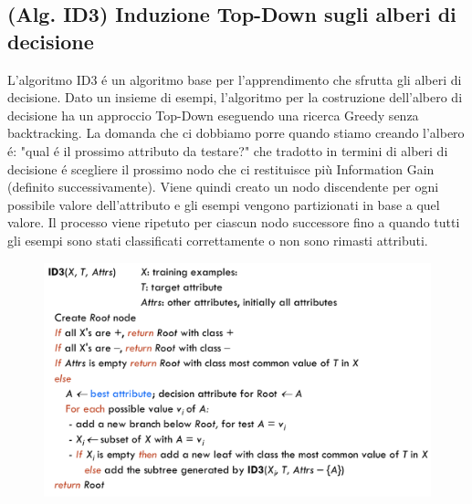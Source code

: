 \documentclass{article}
\begin{document}
\subsection{(Alg. ID3) Induzione Top-Down sugli alberi di decisione}
L'algoritmo ID3 é un algoritmo base per l'apprendimento che sfrutta gli alberi di decisione. Dato un insieme di esempi, l'algoritmo per la costruzione dell'albero di decisione ha un approccio Top-Down eseguendo una ricerca Greedy senza backtracking. La domanda che ci dobbiamo porre quando stiamo creando l'albero é: "qual é il prossimo attributo da testare?" che tradotto in termini di alberi di decisione é scegliere il prossimo nodo che ci restituisce più Information Gain (definito successivamente). Viene quindi creato un nodo discendente per ogni possibile valore dell'attributo e gli esempi vengono partizionati in base a quel valore. Il processo viene ripetuto per ciascun nodo successore fino a quando tutti gli esempi sono stati classificati correttamente o non sono rimasti attributi.
\begin{figure}[H]
\centering
\includegraphics[scale=0.5]{Images/ID3alg.png}
\end{figure}
\end{document}
